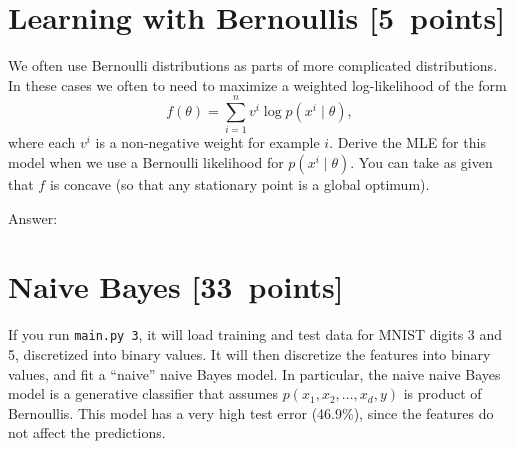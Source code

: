 \documentclass{article}
\newcommand{\ask}[1]{\textcolor{question}{#1}}
\newenvironment{answer}{\par\begingroup\color{answer}Answer: }{\endgroup}
\newcommand{\pts}[1]{\textcolor{points}{[#1~points]}}
\newcommand{\TODO}{\color{red}{TODO}}
\begin{document}
\clearpage
\section{Learning with Bernoullis \pts{5}}


    We often use Bernoulli distributions as parts of more complicated distributions. In these cases we often to need to maximize a weighted log-likelihood of the form
    \[
    f(\theta) = \sum_{i=1}^n v^i \log p(x^i \mid \theta),
    \]
    where each $v^i$ is a non-negative weight for example $i$.
    \ask{Derive the MLE for this model when we use a Bernoulli likelihood for $p(x^i \mid \theta)$.}
    You can take as given that $f$ is concave (so that any stationary point is a global optimum).

\begin{answer}\TODO\end{answer}


\clearpage

\section{Naive Bayes \pts{33}}


If you run \texttt{main.py 3}, it will load training and test data for MNIST digits 3 and 5, discretized into binary values.
It will then discretize the features into binary values, and fit a ``naive'' naive Bayes model.
In particular, the naive naive Bayes model is a generative classifier that assumes $p(x_1, x_2,\dots,x_d,y)$ is product of Bernoullis.
This model has a very high test error (46.9\%), since the features do not affect the predictions.
\end{document}
